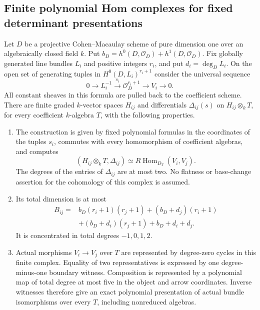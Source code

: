 \subsection{Finite polynomial Hom complexes for fixed determinant presentations}

\begin{proposition}
\label{D:fixed-determinant-finite-Hom}
Let $D$ be a projective Cohen--Macaulay scheme of pure dimension
one over an algebraically closed field $k$. Put
$b_D=h^0(D,\mathcal O_D)+h^1(D,\mathcal O_D)$.
Fix globally generated line bundles $L_i$ and positive integers
$r_i$, and put $d_i=\deg_D L_i$. On the open set of generating
tuples in $H^0(D,L_i)^{r_i+1}$ consider the universal sequence
\[
 0\longrightarrow L_i^{-1}
   \xrightarrow{s_i}\mathcal O_D^{r_i+1}
   \longrightarrow V_i\longrightarrow0.
                                                        \tag{D.FH.1}
\]
All constant sheaves in this formula are pulled back to the
coefficient scheme. There are finite graded $k$-vector spaces
$H_{ij}$ and differentials $\Delta_{ij}(s)$ on
$H_{ij}\otimes_k T$, for every coefficient $k$-algebra $T$,
with the following properties.
\begin{enumerate}
\item The construction is given by fixed polynomial formulas
in the coordinates of the tuples $s_i$, commutes with every
homomorphism of coefficient algebras, and computes
\[
 (H_{ij}\otimes_k T,\Delta_{ij})
       \simeq R\operatorname{Hom}_{D_T}(V_i,V_j).
                                                        \tag{D.FH.2}
\]
The degrees of the entries of $\Delta_{ij}$ are at most two.
No flatness or base-change assertion for the cohomology of
this complex is assumed.
\item Its total dimension is at most
\[
 \begin{split}
 B_{ij}={}&b_D(r_i+1)(r_j+1)
 +(b_D+d_j)(r_i+1)\\
 &+(b_D+d_i)(r_j+1)+b_D+d_i+d_j.
 \end{split}                                           \tag{D.FH.3}
\]
It is concentrated in total degrees $-1,0,1,2$.
\item Actual morphisms $V_i\to V_j$ over $T$ are represented
by degree-zero cycles in this finite complex. Equality of
two representatives is expressed by one degree-minus-one
boundary witness. Composition is represented by a polynomial
map of total degree at most five in the object and arrow
coordinates. Inverse witnesses therefore give an exact
polynomial presentation of actual bundle isomorphisms over
every $T$, including nonreduced algebras.
\end{enumerate}


\end{proposition}
